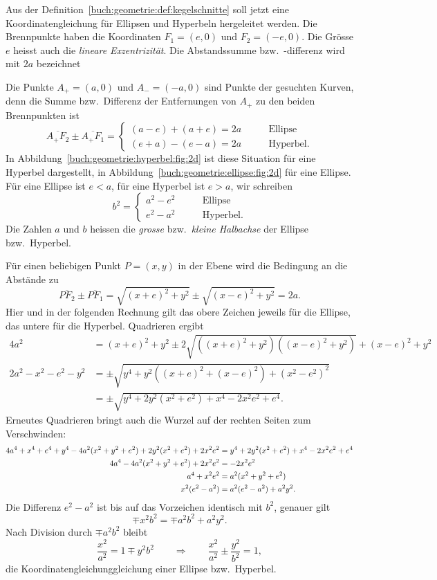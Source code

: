 Aus der Definition~\ref{buch:geometrie:def:kegelschnitte} soll jetzt
eine Koordinatengleichung für Ellipsen und Hyperbeln hergeleitet werden.
Die Brennpunkte haben die Koordinaten $F_1=(e,0)$ und $F_2=(-e,0)$.
Die Grösse $e$ heisst auch die {\em lineare Exzentrizität}.
Die Abstandssumme bzw.~-differenz wird mit $2a$ bezeichnet

Die Punkte $A_+=(a,0)$ und $A_-=(-a,0)$ sind Punkte der gesuchten
Kurven,
denn die Summe bzw.~Differenz der Entfernungen von $A_+$ zu den beiden
Brennpunkten ist
\[
\overline{A_+F_2}
\pm
\overline{A_+F_1}
=
\begin{cases}
(a-e)+(a+e) = 2a
&\qquad\text{Ellipse}
\\
(e+a)-(e-a) = 2a
&\qquad\text{Hyperbel.}
\end{cases}
\]
In Abbildung~\ref{buch:geometrie:hyperbel:fig:2d} ist diese Situation
für eine Hyperbel dargestellt, in 
Abbildung~\ref{buch:geometrie:ellipse:fig:2d} für eine Ellipse.
Für eine Ellipse ist $e<a$, für eine Hyperbel ist $e>a$, wir schreiben
\[
b^2
=
\begin{cases}
a^2-e^2&\qquad\text{Ellipse} \\
e^2-a^2&\qquad\text{Hyperbel.}
\end{cases}
\]
Die Zahlen $a$ und $b$ heissen die {\em grosse} bzw.~{\em kleine Halbachse}
der Ellipse bzw.~Hyperbel.

Für einen beliebigen Punkt $P=(x,y)$ in der Ebene wird die Bedingung
an die Abstände zu
\[
\overline{PF_2}
\pm
\overline{PF_1}
=
\sqrt{(x+e)^2+y^2}
\pm
\sqrt{(x-e)^2+y^2}
=
2a.
\]
Hier und in der folgenden Rechnung gilt das obere Zeichen jeweils
für die Ellipse, das untere für die Hyperbel.
Quadrieren ergibt
\begin{align*}
4a^2
&=
(x+e)^2+y^2
\pm
2\sqrt{
((x+e)^2+y^2)
((x-e)^2+y^2)
}
+
(x-e)^2+y^2
\\
2a^2-x^2-e^2-y^2
&=
\pm\sqrt{
y^4 + y^2((x+e)^2 + (x-e)^2) +(x^2-e^2)^2
}
\\
&=
\pm\sqrt{y^4 + 2y^2 ( x^2+e^2) +x^4 - 2x^2e^2 + e^4}.
\end{align*}
Erneutes Quadrieren bringt auch die Wurzel auf der rechten Seiten
zum Verschwinden:
\begin{align}
4a^4 + x^4 + e^4 + y^4
-4a^2(x^2+y^2+e^2)
+2y^2(x^2+e^2)+2x^2e^2
&=
y^4+2y^2(x^2 +e^2) + x^4 -2x^2e^2+e^4
\notag
\\
4a^4
-4a^2(x^2+y^2+e^2)
+2x^2e^2
&=
-2x^2e^2
\notag
\\
a^4+x^2e^2&=a^2(x^2+y^2+e^2)
\notag
\\
x^2(e^2-a^2)&=a^2(e^2-a^2) + a^2y^2.
\notag
\end{align}
Die Differenz $e^2-a^2$ ist bis auf das Vorzeichen identisch mit $b^2$,
genauer gilt
\begin{equation*}
\mp x^2b^2 = \mp a^2b^2 + a^2y^2.
\end{equation*}
Nach Division durch $\mp a^2b^2$ bleibt
\begin{equation}
\frac{x^2}{a^2} = 1 \mp{y^2}{b^2}
\qquad\Rightarrow\qquad
\frac{x^2}{a^2} \pm \frac{y^2}{b^2} = 1,
\label{buch:geometrie:hyperbel:gleichung}
\end{equation}
die Koordinatengleichunggleichung einer Ellipse bzw.~Hyperbel.

